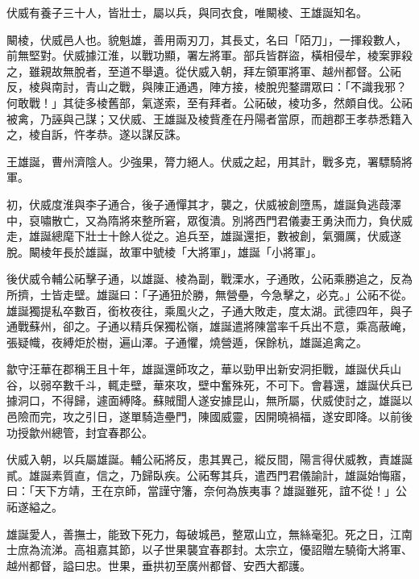 \begin{pinyinscope}
 伏威有養子三十人，皆壯士，屬以兵，與同衣食，唯闞棱、王雄誕知名。



 闞棱，伏威邑人也。貌魁雄，善用兩刃刀，其長丈，名曰「陌刀」，一揮殺數人，前無堅對。伏威據江淮，以戰功顯，署左將軍。部兵皆群盜，橫相侵牟，棱案罪殺之，雖親故無脫者，至道不舉遺。從伏威入朝，拜左領軍將軍、越州都督。公祏反，棱與南討，青山之戰，與陳正通遇，陣方接，棱脫兜鍪謂眾曰：「不識我邪？何敢戰！」其徒多棱舊部，氣遂索，至有拜者。公祏破，棱功多，然頗自伐。公祏被禽，乃誣與己謀；又伏威、王雄誕及棱貲產在丹陽者當原，而趙郡王孝恭悉籍入之，棱自訴，忤孝恭。遂以謀反誅。



 王雄誕，曹州濟陰人。少強果，膂力絕人。伏威之起，用其計，戰多克，署驃騎將軍。



 初，伏威度淮與李子通合，後子通憚其才，襲之，伏威被創墮馬，雄誕負逃葭澤中，裒嘯散亡，又為隋將來整所窘，眾復潰。別將西門君儀妻王勇決而力，負伏威走，雄誕總麾下壯士十餘人從之。追兵至，雄誕還拒，數被創，氣彌厲，伏威遂脫。闞棱年長於雄誕，故軍中號棱「大將軍」，雄誕「小將軍」。



 後伏威令輔公祏擊子通，以雄誕、棱為副，戰溧水，子通敗，公祏乘勝追之，反為所擠，士皆走壁。雄誕曰：「子通狃於勝，無營壘，今急擊之，必克。」公祏不從。雄誕獨提私卒數百，銜枚夜往，乘風火之，子通大敗走，度太湖。武德四年，與子通戰蘇州，卻之。子通以精兵保獨松嶺，雄誕遣將陳當率千兵出不意，乘高蔽崦，張疑幟，夜縛炬於樹，遍山澤。子通懼，燒營遁，保餘杭，雄誕追禽之。



 歙守汪華在郡稱王且十年，雄誕還師攻之，華以勁甲出新安洞拒戰，雄誕伏兵山谷，以弱卒數千斗，輒走壁，華來攻，壁中奮殊死，不可下。會暮還，雄誕伏兵已據洞口，不得歸，遽面縛降。蘇賊聞人遂安據昆山，無所屬，伏威使討之，雄誕以邑險而完，攻之引日，遂單騎造壘門，陳國威靈，因開曉禍福，遂安即降。以前後功授歙州總管，封宜春郡公。



 伏威入朝，以兵屬雄誕。輔公祏將反，患其異己，縱反間，陽言得伏威教，責雄誕貳。雄誕素質直，信之，乃歸臥疾。公祏奪其兵，遣西門君儀諭計，雄誕始悔寤，曰：「天下方靖，王在京師，當謹守籓，奈何為族夷事？雄誕雖死，誼不從！」公祏遂縊之。



 雄誕愛人，善撫士，能致下死力，每破城邑，整眾山立，無絲毫犯。死之日，江南士庶為流涕。高祖嘉其節，以子世果襲宜春郡封。太宗立，優詔贈左驍衛大將軍、越州都督，謚曰忠。世果，垂拱初至廣州都督、安西大都護。




\end{pinyinscope}
